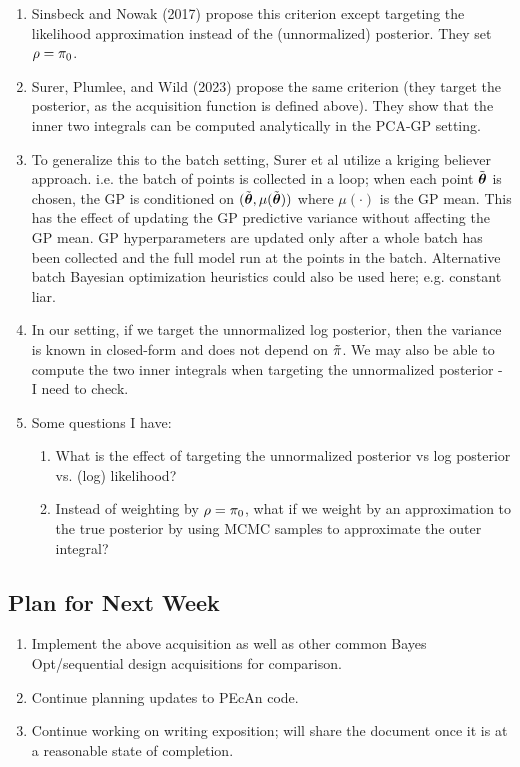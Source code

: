 \documentclass[12pt]{article}
\begin{document}
\begin{enumerate}
\item Sinsbeck and Nowak (2017) propose this criterion except targeting the likelihood approximation instead of the (unnormalized) posterior. They set $\rho = \pi_0$. 
\item Surer, Plumlee, and Wild (2023) propose the same criterion (they target the posterior, as the acquisition function is defined above). They show that the 
inner two integrals can be computed analytically in the PCA-GP setting. 
\item To generalize this to the batch setting, Surer et al utilize a kriging believer approach. i.e. the batch of points is collected in a loop; when each point $\tilde{\boldsymbol{\theta}}$ is chosen, the GP is conditioned on $(\tilde{\boldsymbol{\theta}}, \mu(\tilde{\boldsymbol{\theta}}))$ where $\mu(\cdot)$ is the GP mean. This has the effect of updating the GP predictive variance without affecting 
the GP mean. GP hyperparameters are updated only after a whole batch has been collected and the full model run at the points in the batch. Alternative batch Bayesian 
optimization heuristics could also be used here; e.g. constant liar. 
\item In our setting, if we target the unnormalized log posterior, then the variance is known in closed-form and does not depend on $\tilde{\pi}$. We may also 
be able to compute the two inner integrals when targeting the unnormalized posterior - I need to check. 
\item Some questions I have: 
	\begin{enumerate}
	\item What is the effect of targeting the unnormalized posterior vs log posterior vs. (log) likelihood? 
	\item Instead of weighting by $\rho = \pi_0$, what if we weight by an approximation to the true posterior by using MCMC samples to approximate the outer
	integral? 
	\end{enumerate}
\end{enumerate}

\subsection{Plan for Next Week}
\begin{enumerate}
\item Implement the above acquisition as well as other common Bayes Opt/sequential design acquisitions for comparison. 
\item Continue planning updates to PEcAn code. 
\item Continue working on writing exposition; will share the document once it is at a reasonable state of completion. 
\end{enumerate}
\end{document}
